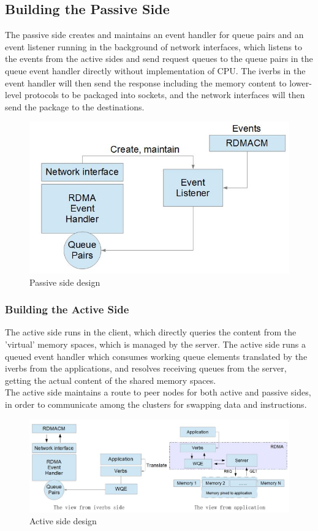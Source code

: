 \documentclass[11pt,openright,a4paper]{report}
\begin{document}
\subsection{Building the Passive Side}
The passive side creates and maintains an event handler for queue pairs and an event listener running in the background of network interfaces, which listens to the events from the active sides and send request queues to the queue pairs in the queue event handler directly without implementation of CPU. The iverbs in the event handler will then send the response including the memory content to lower-level protocols to be packaged into sockets, and the network interfaces will then send the package to the destinations.\\
\begin{figure}[H]
	\centering
    \includegraphics[width=0.6\linewidth]{picture/passive.JPG}
    \caption{Passive side design}
    \label{fig:passive}
\end{figure}
\subsubsection{Building the Active Side}
The active side runs in the client, which directly queries the content from the 'virtual' memory spaces, which is managed by the server. The active side runs a queued event handler which consumes working queue elements translated by the iverbs from the applications, and resolves receiving queues from the server, getting the actual content of the shared memory spaces.\\
The active side maintains a route to peer nodes for both active and passive sides, in order to communicate among the clusters for swapping data and instructions.\\
\begin{figure}
	\centering
    \includegraphics[width=0.8\linewidth]{picture/active.JPG}
    \caption{Active side design}
    \label{fig:active}
\end{figure}
\end{document}
